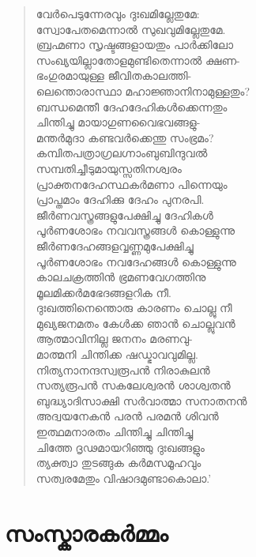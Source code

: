 \begin{verse}
വേര്‍പെടുന്നേരവും ദുഃഖമില്ലേതുമേ:\\
സ്വോപേതമെന്നാല്‍ സുഖവുമില്ലേതുമേ.\\
ബ്രഹ്മണാ സൃഷ്ടങ്ങളായതും പാര്‍ക്കിലോ\\
സംഖ്യയില്ലാതോളമുണ്ടിതെന്നാല്‍ ക്ഷണ-\\
ഭംഗുരമായുള്ള ജീവിതകാലത്തി-\\
ലെന്തൊരാസ്ഥാ മഹാജ്ഞാനിനാമുള്ളതും?\\
ബന്ധമെന്തീ ദേഹദേഹികള്‍ക്കെന്നതും\\
ചിന്തിച്ചു മായാഗുണവൈഭവങ്ങളു-\\
മന്തര്‍മുദാ കണ്ടവര്‍ക്കെന്തു സംഭ്രമം?\\
കമ്പിതപത്രാഗ്രലഗ്നാംബുബിന്ദുവല്‍\\
സമ്പതിച്ചീടുമായുസ്സതിനശ്വരം\\
പ്രാക്തനദേഹസ്ഥകര്‍മണാ പിന്നെയും\\
പ്രാപ്തമാം ദേഹിക്കു ദേഹം പുനരപി.\\
ജീര്‍ണവസ്ത്രങ്ങളുപേക്ഷിച്ചു ദേഹികള്‍\\
പൂര്‍ണശോഭം നവവസ്ത്രങ്ങള്‍ കൊള്ളുന്നു\\
ജീര്‍ണദേഹങ്ങളവ്വണ്ണമുപേക്ഷിച്ചു\\
പൂര്‍ണശോഭം നവദേഹങ്ങള്‍ കൊള്ളുന്നു\\
കാലചക്രത്തിന്‍ ഭ്രമണവേഗത്തിനു\\
മൂലമിക്കര്‍മഭേദങ്ങളറിക നീ.\\
ദുഃഖത്തിനെന്തൊരു കാരണം ചൊല്ലു നീ\\
മുഖ്യജനമതം കേള്‍ക്ക ഞാന്‍ ചൊല്ലുവന്‍\\
ആത്മാവിനില്ല ജനനം മരണവു-\\
മാത്മനി ചിന്തിക്ക ഷഡ്ഭാവവുമില്ല.\\
നിത്യനാനന്ദസ്വരൂപന്‍ നിരാകുലന്‍\\
സത്യരൂപന്‍ സകലേശ്വരന്‍ ശാശ്വതന്‍\\
ബുദ്ധ്യാദിസാക്ഷി സര്‍വാത്മാ സനാതനന്‍\\
അദ്വയനേകന്‍ പരന്‍ പരമന്‍ ശിവന്‍\\
ഇത്ഥമനാരതം ചിന്തിച്ചു ചിന്തിച്ചു\\
ചിത്തേ ദൃഢമായറിഞ്ഞു ദുഃഖങ്ങളും\\
ത്യക്ത്വാ തുടങ്ങുക കര്‍മസമൂഹവും\\
സത്വരമേതും വിഷാദമുണ്ടാകൊലാ.’
\end{verse}


\section{സംസ്കാരകര്‍മ്മം}


